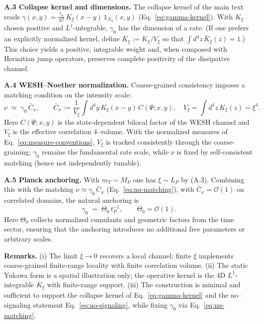 \documentclass[12pt,a4paper]{article}
\numberwithin{equation}{section}
\begin{document}
\vspace{0.3cm}
\noindent\textbf{A.3 Collapse kernel and dimensions.}
The collapse kernel of the main text reads \(\gamma(x,y)=\frac{\gamma_0}{N^2}\,K_\xi(x-y)\,\mathbb{1}_{N_\xi}(x,y)\) (Eq.~\eqref{eq:gamma-kernel}). With $K_\xi$ chosen positive and $L^1$-integrable, $\gamma_0$ has the dimension of a rate.
(If one prefers an explicitly normalized kernel, define $\bar K_\xi:=K_\xi/V_\xi$ so that
$\int d^4z\,\bar K_\xi(z)=1$.) This choice yields a positive, integrable weight and, when composed with Hermitian jump operators, preserves complete positivity of the dissipative channel.

\vspace{0.3cm}
\noindent\textbf{A.4 WESH–Noether normalization.}
Coarse-grained consistency imposes a matching condition on the intensity scale:
\begin{equation}
\nu \;\simeq\; \gamma_0\,\bar C_x,\qquad 
\bar C_x:=\frac{1}{V_\xi}\!\int d^4y\,K_\xi(x-y)\,C(\Psi;x,y),\quad 
V_\xi=\!\int d^4z\,K_\xi(z)\sim \xi^4.
\label{eq:nu-matching} \tag{A.5}
\end{equation}
Here \(C(\Psi;x,y)\) is the state-dependent bilocal factor of the WESH channel and \(V_\xi\) is the effective correlation 4–volume. With the normalized measures of Eq.~\eqref{eq:measure-conventions}, $V_\xi$ is tracked consistently through the coarse-graining; $\gamma_0$ remains the fundamental rate scale, while $\nu$ is fixed by self-consistent matching (hence not independently tunable).

\vspace{0.3cm}
\noindent\textbf{A.5 Planck anchoring.}
With $m_T\sim M_P$ one has $\xi\sim L_P$ by (A.3). Combining this with the matching $\nu\simeq\gamma_0\,\bar C_x$ (Eq.~\eqref{eq:nu-matching}), with $\bar C_x=\mathcal O(1)$ on correlated domains, the natural anchoring is
\begin{equation}
\gamma_0 \;=\; \Theta_0\,t_P^{-1},\qquad \Theta_0=\mathcal O(1).
\tag{A.6}
\end{equation}
Here $\Theta_0$ collects normalized cumulants and geometric factors from the time sector,
ensuring that the anchoring introduces no additional free parameters or arbitrary scales.

\vspace{0.6cm}
\noindent\textbf{Remarks.}
(i) The limit \(\xi\to 0\) recovers a local channel; finite \(\xi\) implements coarse-grained finite-range locality with finite correlation volume.  
(ii) The static Yukawa form is a spatial illustration only; the operative kernel is the 4D $L^1$-integrable \(K_\xi\) with finite-range support.  
(iii) The construction is minimal and sufficient to support the collapse kernel of Eq.~\eqref{eq:gamma-kernel} and the no–signaling statement Eq.~\eqref{eq:no-signaling}, while fixing \(\gamma_0\) via Eq.~\eqref{eq:nu-matching}.
\endgroup
\end{document}
